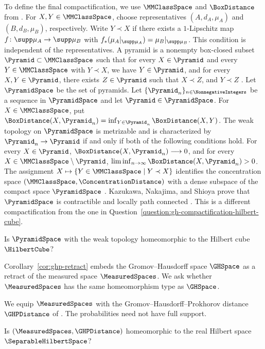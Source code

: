 To define the final compactification,
we use
$\MMClassSpace$
and
$\BoxDistance$
from .
For
$X,Y\in\MMClassSpace$,
choose representatives
$(A,d_A,\mu_A)$
and
$(B,d_B,\mu_B)$,
respectively.
Write
$Y\prec X$
if there exists a
$1$-Lipschitz map
$f\colon\supp\mu_A\to\supp\mu_B$
with
$f_*(\mu_A|_{\supp\mu_A})=\mu_B|_{\supp\mu_B}$.
This condition is independent of the representatives.
A pyramid is a nonempty box-closed subset
$\Pyramid\subset\MMClassSpace$
such that for every
$X\in\Pyramid$
and every
$Y\in\MMClassSpace$
with
$Y\prec X$,
we have
$Y\in\Pyramid$,
and for every
$X,Y\in\Pyramid$,
there exists
$Z\in\Pyramid$
such that
$X\prec Z$,
and
$Y\prec Z$
\cite[arXiv v1, Definitions~2.2 and~2.16]{KazukawaNakajimaShioya2024}.
Let
$\PyramidSpace$
be the set of pyramids.
Let
$\{\Pyramid_n\}_{n\in\NonnegativeIntegers}$
be a sequence in
$\PyramidSpace$
and let
$\Pyramid\in\PyramidSpace$.
For
$X\in\MMClassSpace$,
put
$\BoxDistance(X,\Pyramid_n)
 =\inf_{Y\in\Pyramid_n}\BoxDistance(X,Y)$.
The weak topology on
$\PyramidSpace$
is metrizable and is characterized by
$\Pyramid_n\to\Pyramid$
if and only if both of the following conditions hold.
For every
$X\in\Pyramid$,
$\BoxDistance(X,\Pyramid_n)\longrightarrow0$,
and for every
$X\in\MMClassSpace\setminus\Pyramid$,
$\liminf_{n\to\infty}\BoxDistance(X,\Pyramid_n)>0$.
The assignment
$X\mapsto\{Y\in\MMClassSpace\mid Y\prec X\}$
identifies the concentration space
$(\MMClassSpace,\ConcentrationDistance)$
with a dense subspace of the compact space
$\PyramidSpace$
\cite[arXiv v1, Definition~2.17 and Theorem~2.18]{KazukawaNakajimaShioya2024}.
Kazukawa,
Nakajima,
and Shioya prove that
$\PyramidSpace$
is contractible and locally path connected
\cite[arXiv v1, Theorems~1.4 and~1.6]{KazukawaNakajimaShioya2024}.
This is a different compactification from the one in
Question~\ref{question:gh-compactification-hilbert-cube}.

\begin{question}\label{question:pyramids-hilbert-cube}
Is
$\PyramidSpace$
with the weak topology homeomorphic to the Hilbert cube
$\HilbertCube$?
\end{question}

Corollary~\ref{cor:ghp-retract} embeds the Gromov--Hausdorff space
$\GHSpace$
as a retract of the measured space
$\MeasuredSpaces$.
We ask whether
$\MeasuredSpaces$
has the same homeomorphism type as
$\GHSpace$.

We equip
$\MeasuredSpaces$
with the Gromov--Hausdorff--Prokhorov distance
$\GHPDistance$
of .
The probabilities need not have full support.

\begin{question}\label{question:ghp-hilbert-space}
Is
$(\MeasuredSpaces,\GHPDistance)$
homeomorphic to the real Hilbert space
$\SeparableHilbertSpace$?
\end{question}
